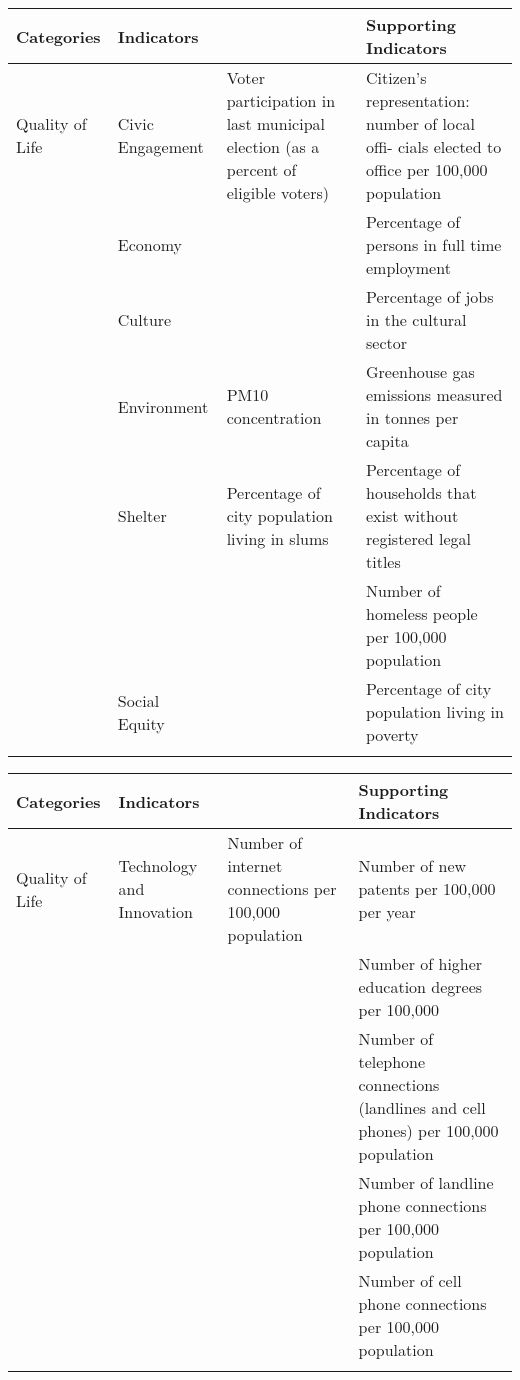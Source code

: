\begin{landscape}
\begin{table}[th]
\begin{center}
\begin{tabular}{ >{\raggedright\arraybackslash}p{} >{\raggedright\arraybackslash}p{} >{\raggedright\arraybackslash}p{} >{\raggedright\arraybackslash}p{} } 
\hline
Categories & Indicators &  & Supporting Indicators \\
\hline
Quality of Life & Civic Engagement & Voter participation in last municipal election (as a percent of eligible voters) & Citizen’s representation: number of local offi- cials elected to office per 100,000 population \linebreak \\
  & Economy &  & Percentage of persons in full time employment \linebreak \\
  & Culture &  & Percentage of jobs in the cultural sector \linebreak \\
  & Environment & PM10 concentration & Greenhouse gas emissions measured in tonnes per capita \linebreak \\
  & Shelter & Percentage of city population living in slums & Percentage of households that exist without registered legal titles \\
  &  &  & Number of homeless people per 100,000 population \linebreak \\
  & Social Equity &  & Percentage of city population living in poverty \\
\hline
\label{tbl:globalCityIndicatorsFacility4}
\end{tabular}
\end{center}
\end{table}

\begin{table}[th]
\begin{center}
\begin{tabular}{ >{\raggedright\arraybackslash}p{} >{\raggedright\arraybackslash}p{} >{\raggedright\arraybackslash}p{} >{\raggedright\arraybackslash}p{} } 
\hline
Categories & Indicators &  & Supporting Indicators \\
\hline
Quality of Life & Technology and Innovation & Number of internet connections per 100,000 population & Number of new patents per 100,000 per year \\
  &  &  & Number of higher education degrees per 100,000 \\
  &  &  & Number of telephone connections (landlines and cell phones) per 100,000 population \\
  &  &  & Number of landline phone connections per 100,000 population \\
  &  &  & Number of cell phone connections per 100,000 population \\
\hline
\label{tbl:globalCityIndicatorsFacility5}
\end{tabular}
\end{center}
\end{table}

\end{landscape}